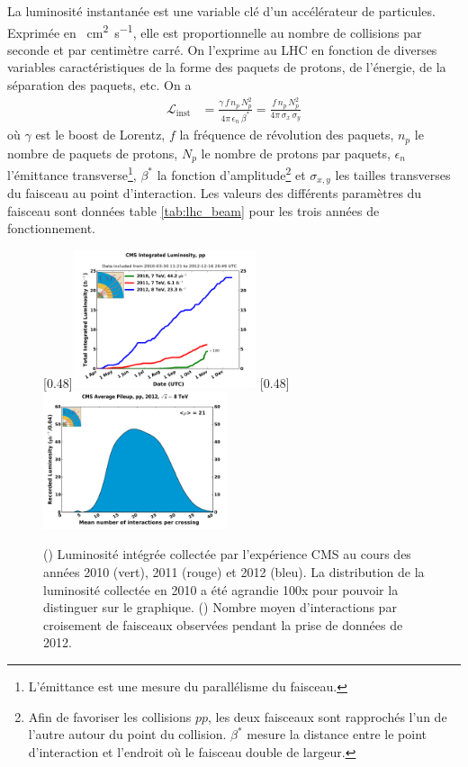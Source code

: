 La luminosité instantanée est une variable clé d'un accélérateur de particules. Exprimée en \si{\per\square\cm\per\second}, elle est proportionnelle au nombre de collisions par seconde et par centimètre carré. On l'exprime au LHC en fonction de diverses variables caractéristiques de la forme des paquets de protons,
de l'énergie, de la séparation des paquets, etc. On a
\begin{align*}
  \mathcal{L}_{\text{inst}} &= \frac{\gamma\,f\,n_p\,N_p^2}{4\pi\,\epsilon_n\,\beta^*} = \frac{f\,n_p\,N_p^2}{4\pi\,\sigma_x\,\sigma_y}
\end{align*}
où $\gamma$ est le boost de Lorentz, $f$ la fréquence de révolution des paquets, $n_p$ le nombre de paquets de protons, $N_p$ le nombre de protons par paquets, $\epsilon_n$ l'émittance transverse\footnote{L'émittance est une mesure du parallélisme du faisceau.}, $\beta^*$ la fonction d'amplitude\footnote{Afin de favoriser les collisions $pp$, les deux faisceaux sont rapprochés l'un de l'autre autour du point du collision. $\beta^*$ mesure la distance entre le point d'interaction et l'endroit où le faisceau double de largeur.} et $\sigma_{x,y}$ les tailles transverses du faisceau au point d'interaction. Les valeurs des différents paramètres du faisceau sont données table \ref{tab:lhc_beam} pour les trois années de fonctionnement.

\begin{figure} \centering
  \subcaptionbox{\label{fig:cms_lumi}}[0.48\textwidth]{\includegraphics[width=0.48\textwidth]{chapitre2/figs/CMS_lumi.pdf}}
  \subcaptionbox{\label{fig:cms_pu}}[0.48\textwidth]{\includegraphics[width=0.48\textwidth]{chapitre2/figs/pileup_pp_2012.pdf}}
  \caption{() Luminosité intégrée collectée par l'expérience CMS au cours des années 2010 (vert), 2011 (rouge) et 2012 (bleu). La distribution de la luminosité collectée en 2010 a été agrandie 100x pour pouvoir la distinguer sur le graphique. () Nombre moyen d'interactions par croisement de faisceaux observées pendant la prise de données de 2012.}
  \label{fig:lumi}
\end{figure}

